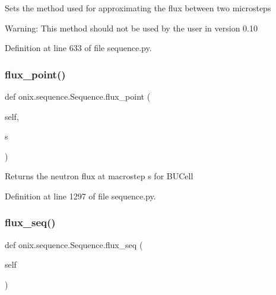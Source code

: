 \begin{DoxyVerb}Sets the method used for approximating the flux between two microsteps

Warning: This method should not be used by the user in version 0.10\end{DoxyVerb}
 

Definition at line 633 of file sequence.\+py.

\mbox{\label{classonix_1_1sequence_1_1Sequence_a4e049d7c4dc532a042da7c4d6297566e}} 
\subsubsection{\texorpdfstring{flux\+\_\+point()}{flux\_point()}}
{\footnotesize\ttfamily def onix.\+sequence.\+Sequence.\+flux\+\_\+point (\begin{DoxyParamCaption}\item[{}]{self,  }\item[{}]{s }\end{DoxyParamCaption})}

\begin{DoxyVerb}Returns the neutron flux at macrostep s for BUCell\end{DoxyVerb}
 

Definition at line 1297 of file sequence.\+py.

\mbox{\label{classonix_1_1sequence_1_1Sequence_a6b1fa0e16ef859ac035ac6b1a77944ad}} 
\subsubsection{\texorpdfstring{flux\+\_\+seq()}{flux\_seq()}\hspace{0.1cm}{\footnotesize\ttfamily [1/2]}}
{\footnotesize\ttfamily def onix.\+sequence.\+Sequence.\+flux\+\_\+seq (\begin{DoxyParamCaption}\item[{}]{self }\end{DoxyParamCaption})}

